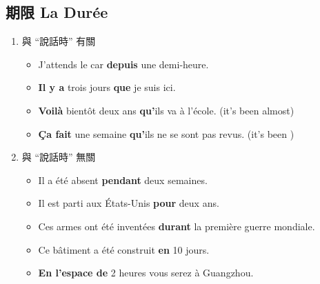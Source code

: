 \documentclass{book}
\begin{document}
        \subsection{期限 La Durée}
            \begin{enumerate}
                \item 與 ``說話時'' 有關
                    \begin{itemize}
                        \item J'attends le car \textbf{depuis} une demi-heure.
                        \item \textbf{Il y a} trois jours \textbf{que} je suis ici.
                        \item \textbf{Voilà} bientôt deux ans \textbf{qu'}ils va à l'école. (it's been almost)
                        \item \textbf{Ça fait} une semaine \textbf{qu'}ils ne se sont pas revus. (it's been )
                    \end{itemize}
                \item 與 ``說話時'' 無關
                    \begin{itemize}
                        \item Il a été absent \textbf{pendant} deux semaines.
                        \item Il est parti aux États-Unis \textbf{pour} deux ans.
                        \item Ces armes ont été inventées \textbf{durant} la première guerre mondiale.
                        \item Ce bâtiment a été construit \textbf{en} 10 jours.
                        \item \textbf{En l'espace de} 2 heures vous serez à Guangzhou.
                    \end{itemize}
            \end{enumerate}
\end{document}
